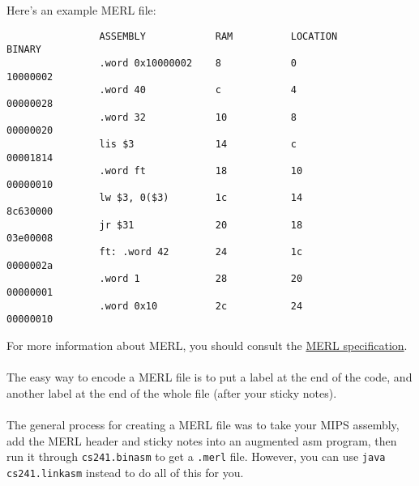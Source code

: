 \documentclass[]{article}
\theoremstyle{definition}
\newcommand{\lecture}[1]{\marginpar{{\footnotesize $\leftarrow$ \underline{#1}}}}
\begin{document}
			Here's an example MERL file:
			\begin{verbatim}
				ASSEMBLY            RAM          LOCATION          BINARY
				.word 0x10000002    8            0                 10000002
				.word 40            c            4                 00000028
				.word 32            10           8                 00000020
				lis $3              14           c                 00001814
				.word ft            18           10                00000010
				lw $3, 0($3)        1c           14                8c630000
				jr $31              20           18                03e00008
				ft: .word 42        24           1c                0000002a
				.word 1             28           20                00000001
				.word 0x10          2c           24                00000010
			\end{verbatim}
			\lecture{January 30, 2013}
			For more information about MERL, you should consult the \href{https://www.student.cs.uwaterloo.ca/~cs241/merl/merl.html}{MERL specification}.
			\\ \\
			The easy way to encode a MERL file is to put a label at the end of the code, and another label at the end of the whole file (after your sticky notes).
			\\ \\
			The general process for creating a MERL file was to take your MIPS assembly, add the MERL header and sticky notes into an augmented asm program, then run it through \verb+cs241.binasm+ to get a \verb+.merl+ file. However, you can use \verb+java cs241.linkasm+ instead to do all of this for you.
\end{document}
